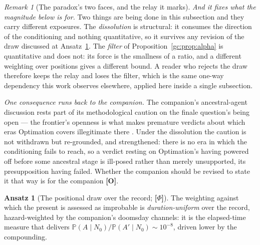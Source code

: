 \documentclass[11pt]{article}
\numberwithin{equation}{section}
\theoremstyle{plain}
\theoremstyle{definition}
\newtheorem{ansatz}[theorem]{Ansatz}
\theoremstyle{remark}
\newtheorem{remark}[theorem]{Remark}
\newcommand{\PP}{\mathbb{P}}
\begin{document}
\begin{remark}[The paradox's two faces, and the relay it marks]
\emph{And it fixes what the magnitude below is for.} Two things are
being done in this subsection and they carry different exposures. The
\emph{dissolution} is structural: it consumes the direction of the
conditioning and nothing quantitative, so it survives any revision of
the draw discussed at Ansatz~\ref{ra:ans:draw}. The \emph{filter} of
Proposition~\ref{gc:prop:alpha} is quantitative and does not: its force
is the smallness of a ratio, and a different weighting over positions
gives a different bound. A reader who rejects the draw therefore keeps
the relay and loses the filter, which is the same one-way dependency
this work observes elsewhere, applied here inside a single subsection.

\emph{One consequence runs back to the companion.} The companion's
ancestral-agent discussion rests part of its methodological caution on
the finale question's being open --- the frontier's openness is what
makes premature verdicts about which eras Optimation covers
illegitimate there \cite{Aethus}. Under the dissolution the caution is
not withdrawn but re-grounded, and strengthened: there is no era in
which the conditioning fails to reach, so a verdict resting on
Optimation's having powered off before some ancestral stage is
ill-posed rather than merely unsupported, its presupposition
having failed. Whether the
companion should be revised to state it that way is for the companion
\textbf{[O]}.
\end{remark}

\begin{ansatz}[The positional draw over the record; \textbf{[$\Phi$]}]
\label{ra:ans:draw}
The weighting against which the present is assessed as improbable is
\emph{duration-uniform} over the record, hazard-weighted by the
companion's doomsday channels: it is the elapsed-time measure that
delivers $\PP(A\mid N_0)/\PP(A'\mid N_0)\sim10^{-8}$, driven lower by
the compounding.
\end{ansatz}
\end{document}
